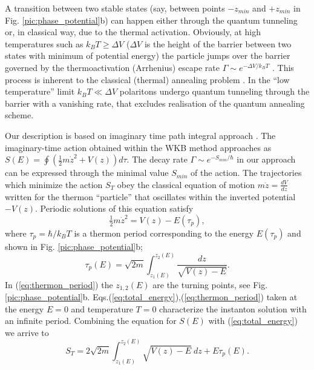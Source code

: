 \documentclass[aps, pre, preprint, groupedaddress, superscriptaddress, showkeys, showpacs] {revtex4-1}
\begin{document}
A transition between two stable states (say, between points $-z_{min}$ and $+z_{min}$ in Fig. \ref{pic:phase_potential}b) can happen  either through the quantum tunneling or, in classical way, due to the thermal activation. 
Obviously, at high temperatures such as $k_{B}T\ge\Delta V$ ($\Delta V$ is the height of the barrier between two states with minimum of potential energy) the particle jumps over the barrier governed by the thermoactivation (Arrhenius) escape rate $\Gamma \sim e^{-\Delta V /k_{B}T}$ \cite{Larkin}. This process is inherent to the classical (thermal) annealing problem \cite{Das}. 
In the ``low temperature'' limit $k_{B}T\ll\Delta V$ polaritons undergo quantum tunneling through the barrier with a vanishing rate, that excludes realisation of the quantum annealing scheme.

Our description is based on imaginary time path integral approach \cite{Ankerhold}.
The imaginary-time action obtained within the WKB method approaches as $S(E) = \oint (\tfrac{1}{2} m \dot{z}^2 + V(z)) d \tau$.
The decay rate $\Gamma \sim e^{-S_{min}/\hbar}$ in our approach can be expressed through the minimal value $S_{min}$ of the action.
The trajectories which minimize the action $S_T$ obey the classical equation of motion $m \ddot{z} = \frac{d V}{dz}$ written for the thermon ``particle'' that oscillates within the inverted potential $-V(z)$.
Periodic solutions of this equation satisfy
%
\begin{equation}
\tfrac{1}{2} m \dot{z}^2 = V(z) - E(\tau_p),
\label{eq:total_energy}
\end{equation}
%
where $\tau_p = \hbar / k_B T$ is a thermon period corresponding to the energy $E(\tau_p)$ and shown in Fig. \ref{pic:phase_potential}b;
%
\begin{equation}
\tau_p(E) = \sqrt{2 m} \int_{z_1(E)}^{z_2(E)} \frac{dz}{\sqrt{V(z) - E}}.
\label{eq:thermon_period}
\end{equation}
%
In (\ref{eq:thermon_period}) the $z_{1,2}(E)$ are the turning points, see Fig. \ref{pic:phase_potential}b.
Eqs.(\ref{eq:total_energy}),(\ref{eq:thermon_period}) taken at the energy $E = 0$ and temperature $T = 0$ characterize the instanton solution with an infinite period.
Combining the equation for $S(E)$ 
with (\ref{eq:total_energy}) we arrive to 
%
\begin{equation}
S_T = 2 \sqrt{2 m} \int_{z_1(E)}^{z_2(E)} \sqrt{V(z) - E} ~dz + E \tau_p (E).
\label{eq:thermon_action_2}
\end{equation}
%
\end{document}
